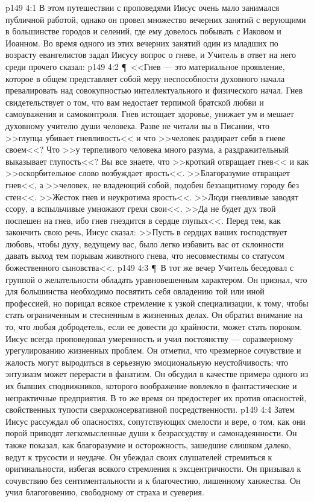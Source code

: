\vs p149 4:1 В этом путешествии с проповедями Иисус очень мало занимался публичной работой, однако он провел множество вечерних занятий с верующими в большинстве городов и селений, где ему довелось побывать с Иаковом и Иоанном. Во время одного из этих вечерних занятий один из младших по возрасту евангелистов задал Иисусу вопрос о гневе, и Учитель в ответ на него среди прочего сказал:
\vs p149 4:2 \P\ <<Гнев --- это материальное проявление, которое в общем представляет собой меру неспособности духовного начала превалировать над совокупностью интеллектуального и физического начал. Гнев свидетельствует о том, что вам недостает терпимой братской любви и самоуважения и самоконтроля. Гнев истощает здоровье, унижает ум и мешает духовному учителю души человека. Разве не читали вы в Писании, что >>глупца убивает гневливость<< и что >>человек раздирает себя в гневе своем<<? Что >>у терпеливого человека много разума, а раздражительный выказывает глупость<<? Вы все знаете, что >>кроткий отвращает гнев<< и как >>оскорбительное слово возбуждает ярость<<. >>Благоразумие отвращает гнев<<, а >>человек, не владеющий собой, подобен беззащитному городу без стен<<. >>Жесток гнев и неукротима ярость<<. >>Люди гневливые заводят ссору, а вспыльчивые умножают грехи свои<<. >>Да не будет дух твой поспешен на гнев, ибо гнев гнездится в сердце глупых<<. Перед тем, как закончить свою речь, Иисус сказал: >>Пусть в сердцах ваших господствует любовь, чтобы духу, ведущему вас, было легко избавить вас от склонности давать выход тем порывам животного гнева, что несовместимы со статусом божественного сыновства<<.
\vs p149 4:3 \P\ В тот же вечер Учитель беседовал с группой о желательности обладать уравновешенным характером. Он признал, что для большинства необходимо посвятить себя овладению той или иной профессией, но порицал всякое стремление к узкой специализации, к тому, чтобы стать ограниченным и стесненным в жизненных делах. Он обратил внимание на то, что любая добродетель, если ее довести до крайности, может стать пороком. Иисус всегда проповедовал умеренность и учил постоянству --- соразмерному урегулированию жизненных проблем. Он отметил, что чрезмерное сочувствие и жалость могут выродиться в серьезную эмоциональную неустойчивость; что энтузиазм может перерасти в фанатизм. Он обсудил в качестве примера одного из их бывших сподвижников, которого воображение вовлекло в фантастические и непрактичные предприятия. В то же время он предостерег их против опасностей, свойственных тупости сверхконсервативной посредственности.
\vs p149 4:4 Затем Иисус рассуждал об опасностях, сопутствующих смелости и вере, о том, как они порой приводят легкомысленные души к безрассудству и самонадеянности. Он также показал, как благоразумие и осторожность, зашедшие слишком далеко, ведут к трусости и неудаче. Он убеждал своих слушателей стремиться к оригинальности, избегая всякого стремления к эксцентричности. Он призывал к сочувствию без сентиментальности и к благочестию, лишенному ханжества. Он учил благоговению, свободному от страха и суеверия.
